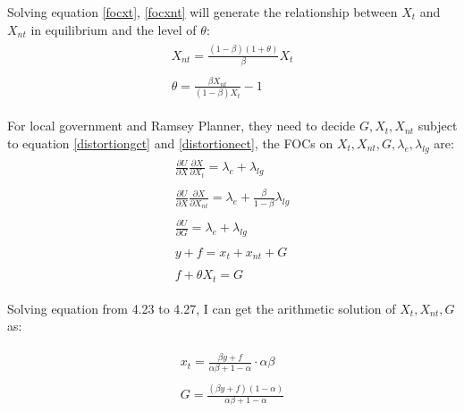 Solving equation \ref{focxt}, \ref{focxnt} will generate the relationship between $X_t$ and $X_{nt}$ in equilibrium and the level of $\theta$:
\begin{align}
    \begin{split}
        X_{nt}=\frac{(1-\beta)(1+\theta)}{\beta}X_t \label{xtxnt}
    \end{split} \\
    \begin{split}
        \theta=\frac{\beta X_{n t}}{(1-\beta) X_t}-1 \label{theta}
    \end{split}
\end{align}

For local government and Ramsey Planner, they need to decide $G, X_t, X_{nt}$ subject to equation \ref*{distortiongct} and \ref*{distortionect}, the FOCs on $X_t, X_{nt}, G, \lambda_e, \lambda_{lg}$ are:
\begin{align}
    \begin{split}
        \frac{\partial U}{\partial X} \frac{\partial X}{\partial X_t}=\lambda_e+\lambda_{l g}
    \end{split}                                                      \\
    \begin{split}
        \frac{\partial U}{\partial X} \frac{\partial X}{\partial X_{nt}}=\lambda_e +\frac{\beta}{1-\beta} \lambda_{l g}
    \end{split} \\
    \begin{split}
        \frac{\partial U}{\partial G}=\lambda_e+\lambda_{l g}
    \end{split}                                                                                      \\
    \begin{split}
        y+f=x_t+x_{nt}+G
    \end{split}                                                                                                                           \\
    \begin{split}
        f+\theta X_t=G
    \end{split}
\end{align}

Solving equation from 4.23 to 4.27, I can get the arithmetic solution of $X_t, X_{nt}, G$ as:

\begin{align}
    \begin{split}
        x_t=\frac{\beta y+f}{\alpha \beta+1-\alpha} \cdot \alpha \beta
    \end{split} \\
    \begin{split}
        G=\frac{(\beta y+f)(1-\alpha)}{\alpha \beta+1-\alpha}
    \end{split}
\end{align}

